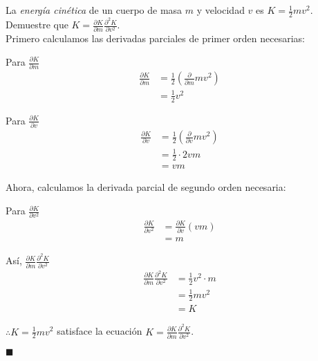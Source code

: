 \documentclass[12pt]{article}
\begin{document}
\section{}

La \textit{energía cinética} de un cuerpo de masa $m$ y velocidad $v$ es $K = \frac{1}{2}mv^2$. Demuestre que $K=\frac{\partial K}{\partial m} \frac{\partial ^2 K}{\partial v^2}$. \\

Primero calculamos las derivadas parciales de primer orden necesarias:

Para $\frac{\partial K}{\partial m}$
\begin{align*}
  \frac{\partial K}{\partial m}
  &= \frac{1}{2} \left(\frac{\partial}{\partial m}mv^2 \right) \\
  &= \frac{1}{2} v^2
\end{align*}

Para $\frac{\partial K}{\partial v}$
\begin{align*}
  \frac{\partial K}{\partial v}
  &= \frac{1}{2} \left(\frac{\partial}{\partial v}mv^2 \right) \\
  &= \frac{1}{2} \cdot 2vm \\
  &= vm
\end{align*}

Ahora, calculamos la derivada parcial de segundo orden necesaria:

Para $\frac{\partial K}{\partial v^2}$
\begin{align*}
  \frac{\partial K}{\partial v^2}
  &= \frac{\partial K}{\partial v} \left( vm \right) \\
  &= m
\end{align*}

Así, $\frac{\partial K}{\partial m} \frac{\partial ^2 K}{\partial v^2}$
\begin{align*}
  \frac{\partial K}{\partial m} \frac{\partial ^2 K}{\partial v^2}
  &= \frac{1}{2} v^2 \cdot m \\
  &= \frac{1}{2} mv^2 \\
  &= K
\end{align*}

$\therefore K=\frac{1}{2} mv^2$ satisface la ecuación $K=\frac{\partial K}{\partial m} \frac{\partial ^2 K}{\partial v^2}$.

\begin{flushright}
  $\blacksquare$
\end{flushright}
\end{document}
